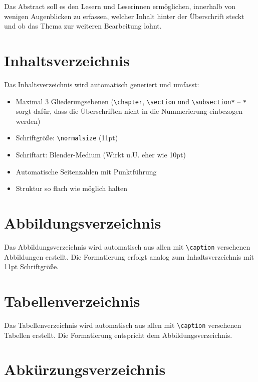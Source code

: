 Das Abstract soll es den Lesern und Leserinnen ermöglichen, innerhalb von wenigen Augenblicken zu erfassen, welcher Inhalt hinter der Überschrift steckt und ob das Thema zur weiteren Bearbeitung lohnt.

\section{Inhaltsverzeichnis}
\label{sec:inhaltsverzeichnis_format}

Das Inhaltsverzeichnis wird automatisch generiert und umfasst:
\begin{itemize}
	\item Maximal 3 Gliederungsebenen (\texttt{\textbackslash chapter}, \texttt{\textbackslash section} und \texttt{\textbackslash subsection*} – \texttt{*} sorgt dafür, dass die Überschriften nicht in die Nummerierung einbezogen werden)
	\item Schriftgröße: \texttt{\textbackslash normalsize} (11pt)
	\item Schriftart: Blender-Medium (Wirkt u.U. eher wie 10pt)
	\item Automatische Seitenzahlen mit Punktführung
	\item Struktur so flach wie möglich halten
\end{itemize}

\newpage
\section{Abbildungsverzeichnis}
\label{sec:abbildungsverzeichnis}

Das Abbildungsverzeichnis wird automatisch aus allen mit \texttt{\textbackslash caption} versehenen Abbildungen erstellt. Die Formatierung erfolgt analog zum Inhaltsverzeichnis mit 11pt Schriftgröße.

\section{Tabellenverzeichnis}
\label{sec:tabellenverzeichnis}

Das Tabellenverzeichnis wird automatisch aus allen mit \texttt{\textbackslash caption} versehenen Tabellen erstellt. Die Formatierung entspricht dem Abbildungsverzeichnis.

\section{Abkürzungsverzeichnis}
\label{sec:abkuerzungsverzeichnis}

